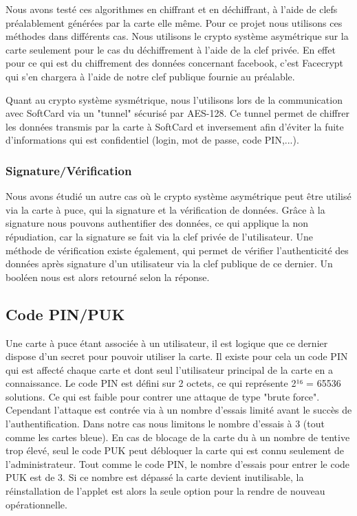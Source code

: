 \documentclass[a4paper,11pt,french]{article}
\begin{document}
Nous avons testé ces algorithmes en chiffrant et en déchiffrant, à l'aide de clefs préalablement générées par la carte
elle même. Pour ce projet nous utilisons ces méthodes dans différents cas. Nous utilisons le crypto système asymétrique
sur la carte seulement pour le cas du déchiffrement à l'aide de la clef privée. En effet pour ce qui est du chiffrement
des données concernant facebook, c'est Facecrypt qui s'en chargera à l'aide de notre clef publique fournie au préalable.

Quant au crypto système sysmétrique, nous l'utilisons lors de la communication avec SoftCard
via un "tunnel" sécurisé par AES-128. Ce tunnel permet de chiffrer les données transmis par la carte à SoftCard et inversement afin
d'éviter la fuite d'informations qui est confidentiel (login, mot de passe, code PIN,...). \\

\subsubsection{Signature/Vérification}
Nous avons étudié un autre cas où le crypto système asymétrique peut être utilisé via la carte à puce, qui la signature et la
vérification de données. Grâce à la signature nous pouvons authentifier des données, ce qui applique la non répudiation, car la signature se fait via la clef privée de l'utilisateur. Une méthode de vérification existe également, qui permet de vérifier l'authenticité des données
après signature d'un utilisateur via la clef publique de ce dernier. Un booléen nous est alors retourné selon la réponse.


\subsection{Code PIN/PUK}
Une carte à puce étant associée à un utilisateur, il est logique que ce dernier dispose d'un secret pour pouvoir utiliser
la carte. Il existe pour cela un code PIN qui est affecté chaque carte et dont seul l'utilisateur principal de la carte en a connaissance.
Le code PIN est défini sur 2 octets, ce qui représente 2¹⁶ = 65536 solutions. Ce qui est faible pour contrer une attaque de type "brute force". Cependant l'attaque est contrée via à un nombre d'essais limité avant le succès de l'authentification. Dans notre cas nous limitons
le nombre d'essais à 3 (tout comme les cartes bleue). En cas de blocage de la carte du à un nombre de tentive trop élevé, seul le code PUK
peut débloquer la carte qui est connu seulement de l'administrateur. Tout comme le code PIN, le nombre d'essais pour entrer le code PUK
est de 3. Si ce nombre est dépassé la carte devient inutilisable, la réinstallation de l'applet est alors la seule option pour la rendre
de nouveau opérationnelle.
\end{document}
